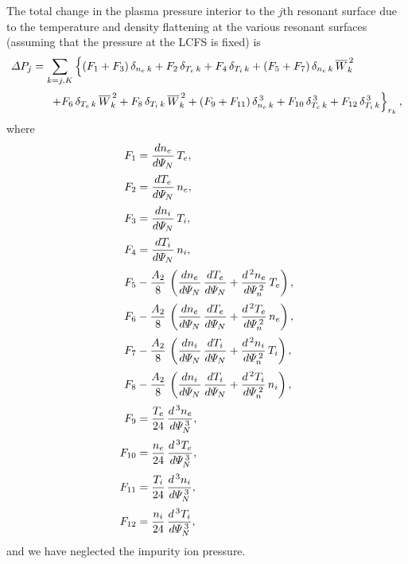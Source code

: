 \documentclass[notitlepage,12pt]{article}
\begin{document}
The total change in the plasma pressure interior to the $j$th resonant surface due to the temperature and
density flattening at the various resonant surfaces (assuming that the pressure at the LCFS is fixed) is
\begin{align}
{\mit\Delta}P_j &=\sum_{k=j,K} 
\left\{(F_1+F_3)\,\delta_{n_e\,k}+ F_2\,\delta_{T_e\,k}+F_4\,\delta_{T_i\,k} + (F_5+F_7)\,\delta_{n_e\,k}\,\overline{W}_k^{\,2}
\right.\nonumber\\[0.5ex]
&\phantom{++}\left.+F_6\, \delta_{T_e\,k}\,\overline{W}_k^{\,2}+ F_8\,\delta_{T_i\,k}\,\overline{W}_k^{\,2}+ (F_9+F_{11})\,\delta_{n_e\,k}^{\,3}
+ F_{10}\,\delta_{T_e\,k}^{\,3}+ F_{12}\,\delta_{T_i\,k}^{\,3}\right\}_{r_k},
\end{align}
where
\begin{align}
F_1 &=\frac{dn_e}{d{\mit\Psi}_N}\,T_e,\\[0.5ex]
F_2 &=\frac{dT_e}{d{\mit\Psi}_N}\,n_e,\\[0.5ex]
F_3 &=\frac{dn_i}{d{\mit\Psi}_N}\,T_i,\\[0.5ex]
F_4 &=\frac{dT_i}{d{\mit\Psi}_N}\,n_i,\\[0.5ex]
F_5& -\frac{A_2}{8}\,\left(\frac{dn_e}{d{\mit\Psi}_N}\,\frac{dT_e}{d{\mit\Psi}_N}+\frac{d^{\,2}n_e}{d{\mit\Psi}_n^{\,2}}\,T_e\right),\\[0.5ex]
F_6& -\frac{A_2}{8}\,\left(\frac{dn_e}{d{\mit\Psi}_N}\,\frac{dT_e}{d{\mit\Psi}_N}+\frac{d^{\,2}T_e}{d{\mit\Psi}_n^{\,2}}\,n_e\right),\\[0.5ex]
F_7& -\frac{A_2}{8}\,\left(\frac{dn_i}{d{\mit\Psi}_N}\,\frac{dT_i}{d{\mit\Psi}_N}+\frac{d^{\,2}n_i}{d{\mit\Psi}_n^{\,2}}\,T_i\right),\\[0.5ex]
F_8& -\frac{A_2}{8}\,\left(\frac{dn_i}{d{\mit\Psi}_N}\,\frac{dT_i}{d{\mit\Psi}_N}+\frac{d^{\,2}T_i}{d{\mit\Psi}_n^{\,2}}\,n_i\right),\\[0.5ex]
F_9&=\frac{T_e}{24}\,\frac{d^{\,3}n_e}{d{\mit\Psi}_N^{\,3}},\\[0.5ex]
F_{10}&=\frac{n_e}{24}\,\frac{d^{\,3}T_e}{d{\mit\Psi}_N^{\,3}},\\[0.5ex]
F_{11}&=\frac{T_i}{24}\,\frac{d^{\,3}n_i}{d{\mit\Psi}_N^{\,3}},\\[0.5ex]
F_{12}&=\frac{n_i}{24}\,\frac{d^{\,3}T_i}{d{\mit\Psi}_N^{\,3}},
\end{align} 
and we have neglected the impurity ion pressure. 
\end{document}
